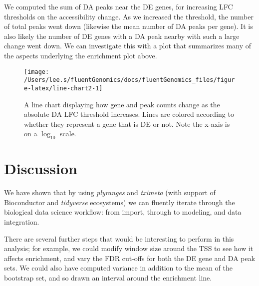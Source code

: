 \documentclass[
]{article}
\newenvironment{Shaded}{}{}
\newcommand{\DataTypeTok}[1]{\textcolor[rgb]{0.56,0.13,0.00}{#1}}
\newcommand{\DecValTok}[1]{\textcolor[rgb]{0.25,0.63,0.44}{#1}}
\newcommand{\KeywordTok}[1]{\textcolor[rgb]{0.00,0.44,0.13}{\textbf{#1}}}
\newcommand{\NormalTok}[1]{#1}
\newcommand{\OperatorTok}[1]{\textcolor[rgb]{0.40,0.40,0.40}{#1}}
\newcommand{\StringTok}[1]{\textcolor[rgb]{0.25,0.44,0.63}{#1}}
\begin{document}
We computed the sum of DA peaks near the DE genes, for increasing LFC
thresholds on the accessibility change. As we increased the threshold, the
number of total peaks went down (likewise the mean number of DA peaks per
gene). It is also likely the number of DE genes with a DA peak nearby with such
a large change went down. We can investigate this with a plot that summarizes
many of the aspects underlying the enrichment plot above.

\begin{Shaded}
\end{Shaded}

\begin{figure}

{\centering \texttt{[image: /Users/lee.s/fluentGenomics/docs/fluentGenomics\_files/figure-latex/line-chart2-1]} 

}

\caption{A line chart displaying how gene and peak counts change as the
absolute DA LFC threshold increases. Lines are colored according to whether
they represent a gene that is DE or not. Note the x-axis is on a \(\log_{10}\)
scale.}\label{fig:line-chart2}
\end{figure}

\hypertarget{discussion}{%
\section{Discussion}\label{discussion}}

We have shown that by using \emph{plyranges} and \emph{tximeta} (with support of
Bioconductor and \emph{tidyverse} ecosystems) we can fluently iterate through the
biological data science workflow: from import, through to modeling, and data
integration.

There are several further steps that would be interesting to perform in this
analysis; for example, we could modify window size around the TSS to see how it
affects enrichment, and vary the FDR cut-offs for both the DE gene and DA peak
sets. We could also have computed variance in addition to the mean of the
bootstrap set, and so drawn an interval around the enrichment line.
\end{document}
